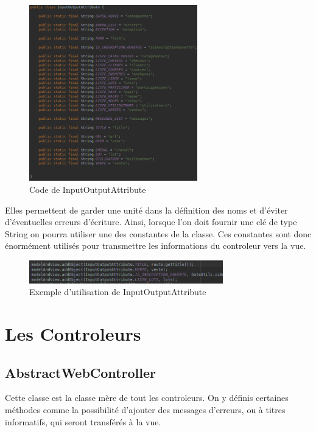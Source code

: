 		\begin{figure}[H]
			\centering\includegraphics[width=0.65\textwidth, keepaspectratio]{res/InputOutputAttribute.png}
			\caption{Code de InputOutputAttribute}
		\end{figure}

		Elles permettent de garder une unité dans la définition des noms et d'éviter d'éventuelles erreurs d'écriture. Ainsi, lorsque l'on doit fournir une clé de type String on pourra utiliser une des constantes de la classe. Ces constantes sont donc énormément utilisés pour transmettre les informations du controleur vers la vue.

		\begin{figure}[H]
			\centering\includegraphics[width=0.75\textwidth, keepaspectratio]{res/InputOutputAttribute-controller.png}
			\caption{Exemple d'utilisation de InputOutputAttribute}
		\end{figure}

	\section{Les Controleurs}

		\subsection{AbstractWebController}

			Cette classe est la classe mère de tout les controleurs. On y définis certaines méthodes comme la possibilité d'ajouter des messages d'erreurs, ou à titres informatifs, qui seront transférés à la vue.

